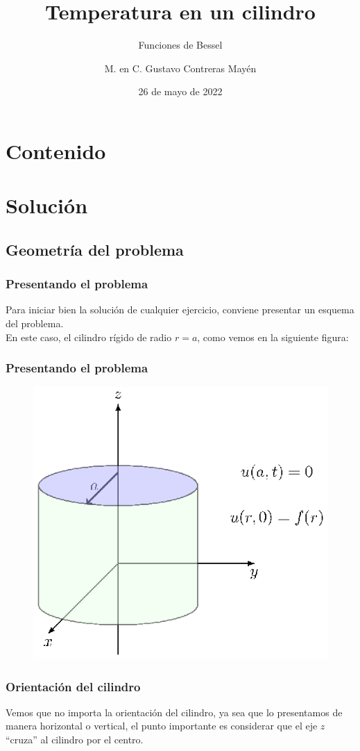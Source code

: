 \documentclass[12pt]{beamer}
\date{26 de mayo de 2022}
\title{\large{Temperatura en un cilindro}}
\subtitle{Funciones de Bessel}
\author{M. en C. Gustavo Contreras Mayén}
\begin{document}
\maketitle
\fontsize{14}{14}\selectfont
{}

\section*{Contenido}

\section{Solución}
\subsection{Geometría del problema}

\begin{frame}
\frametitle{Presentando el problema}
Para iniciar bien la solución de cualquier ejercicio, conviene presentar un esquema del problema.
\\
\bigskip
\pause
En este caso, el cilindro rígido de radio $r = a$, como vemos en la siguiente figura:
\end{frame}
\begin{frame}
\frametitle{Presentando el problema}
\begin{figure}[H]
    \centering
    \includegraphics[scale=1]{Imagenes/plot_cilindro_Bessel_01.eps}
\end{figure}
\end{frame}
\begin{frame}
\frametitle{Orientación del cilindro}
Vemos que no importa la orientación del cilindro, ya sea que lo presentamos de manera horizontal o vertical, \pause el punto importante es considerar que el eje $z$ \enquote{cruza} al cilindro por el centro.
\end{frame}
\end{document}
